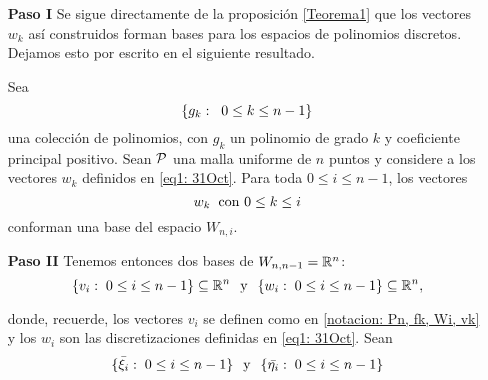 \begin{itemize}
\item[\textbf{Paso I}] 
Se sigue directamente de la proposición 
\eqref{Teorema1} que
los vectores $w_{k}$ así
construidos forman bases para los espacios
de polinomios discretos. Dejamos esto por escrito 
en el siguiente resultado.
\begin{prop}
\label{prop: los wk forman bases de los Wnk}
Sea 
\begin{equation}
\label{eq5: 2En}
\{g_{k}: \hspace{0.2cm} 0 \leq k \leq n-1 \} 
\end{equation}
una colección
de polinomios, con $g_{k}$ un polinomio de grado $k$ y coeficiente 
principal positivo. Sean 
$\mathcal{P}$ una malla uniforme de $n$ puntos y 
considere a los vectores $w_{k}$ 
definidos en \eqref{eq1: 31Oct}.
Para toda $0 \leq i \leq n-1$, los vectores
\[
w_{k} \hspace{0.2cm} \text{con } 0 \leq k \leq i
\]
conforman una base del espacio $W_{n,i}$.
\end{prop}

\item[\textbf{Paso II}] 
Tenemos entonces dos bases de 
$W_{n,n-1}=\mathbb{R}^{n}$:
\begin{equation}
\label{eq2: 31Oct}
\{v_{i} : \hspace{0.1cm} 0 \leq i \leq n-1 \} \subseteq \mathbb{R}^{n}
\hspace{0.25cm} \text{y} \hspace{0.25cm}
\{w_{i} : \hspace{0.1cm}  0 \leq i \leq n-1 \}\subseteq \mathbb{R}^{n},
\end{equation}

donde, recuerde, los vectores $v_{i}$ se definen como en
\ref{notacion: Pn, fk, Wi, vk}
y los $w_{i}$ son las discretizaciones definidas en
\eqref{eq1: 31Oct}.
Sean
\begin{equation}
\label{eq3: 31Oct}
\{\bar{\xi_{i}}: \hspace{0.1cm}  0 \leq i \leq n-1 \}
\hspace{0.25cm} \text{y} \hspace{0.25cm}
\{\bar{\eta_{i}}: \hspace{0.1cm}  0 \leq i \leq n-1 \}
\end{equation}


\end{itemize}
